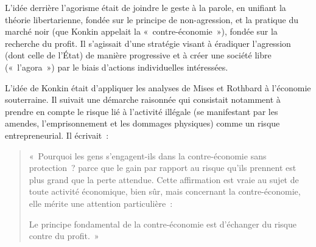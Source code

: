 L'idée derrière l'agorisme était de joindre le geste à la parole, en unifiant la théorie libertarienne, fondée sur le principe de non-agression, et la pratique du marché noir (que Konkin appelait la «~contre-économie~»), fondée sur la recherche du profit. Il s'agissait d'une stratégie visant à éradiquer l'agression (dont celle de l'État) de manière progressive et à créer une société libre («~l'agora~») par le biais d'actions individuelles intéressées.

L'idée de Konkin était d'appliquer les analyses de Mises et Rothbard à l'économie souterraine. Il suivait une démarche raisonnée qui consistait notamment à prendre en compte le risque lié à l'activité illégale (se manifestant par les amendes, l'emprisonnement et les dommages physiques) comme un risque entrepreneurial. Il écrivait~:

\begin{quote}
«~Pourquoi les gens s'engagent-ils dans la contre-économie sans protection~? parce que le gain par rapport au risque qu'ils prennent est plus grand que la perte attendue. Cette affirmation est vraie au sujet de toute activité économique, bien sûr, mais concernant la contre-économie, elle mérite une attention particulière~:

Le principe fondamental de la contre-économie est d'échanger du risque contre du profit.~»
\end{quote} %

